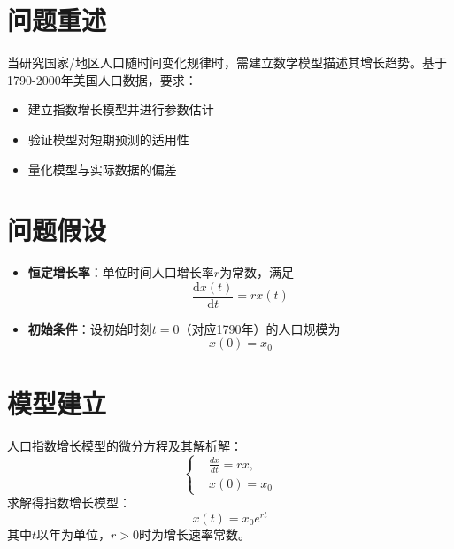\section{问题重述}
当研究国家/地区人口随时间变化规律时，需建立数学模型描述其增长趋势。基于1790-2000年美国人口数据，要求：
\begin{itemize}
    \item 建立指数增长模型并进行参数估计
    \item 验证模型对短期预测的适用性
    \item 量化模型与实际数据的偏差
\end{itemize}

\section{问题假设}\label{sec:Premise}
\begin{itemize}[leftmargin=2em]
    \item \textbf{恒定增长率}：单位时间人口增长率$r$为常数，满足
        \begin{equation}
            \frac{\mathrm{d}x(t)}{\mathrm{d}t} = r x(t)
        \end{equation}
    \item \textbf{初始条件}：设初始时刻$t=0$（对应1790年）的人口规模为
        \begin{equation}
            x(0) = x_0
        \end{equation}
\end{itemize}

\section{模型建立}\label{sec:Model}
人口指数增长模型的微分方程及其解析解：
\begin{equation}\label{eq:diff_eq}
    \left\{
    \begin{aligned}
        &\frac{dx}{dt} = r x, \\
        &x(0) = x_0
    \end{aligned}
    \right.
\end{equation}
求解得指数增长模型：
\begin{equation}
    x(t) = x_0 e^{r t} \label{eq:exp_growth}
\end{equation}
其中$t$以年为单位，$r>0$时为增长速率常数。

